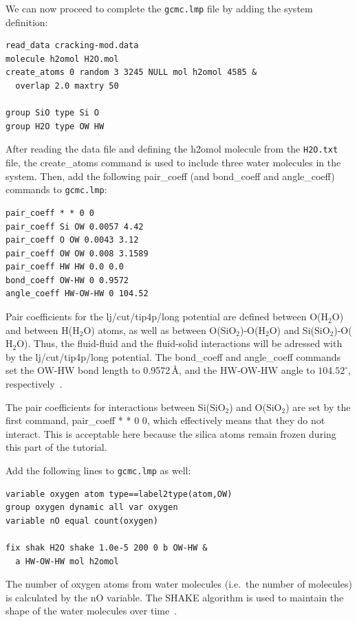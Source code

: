 \documentclass[9pt,tutorial]{livecoms}
\newcommand{\lmpcmd}[1]{\colorbox{listing}{\textcolor{command}{\small{#1}}}} %
\newcommand{\flecmd}[1]{\textcolor{command}{\texttt{#1}}} %
\begin{document}
We can now proceed to complete the \flecmd{gcmc.lmp} file by adding the system definition:
\begin{lstlisting}
read_data cracking-mod.data
molecule h2omol H2O.mol
create_atoms 0 random 3 3245 NULL mol h2omol 4585 &
  overlap 2.0 maxtry 50

group SiO type Si O
group H2O type OW HW
\end{lstlisting}
After reading the data file and defining the \lmpcmd{h2omol} molecule from the \flecmd{H2O.txt}
file, the \lmpcmd{create\_atoms} command is used to include three water molecules
in the system.  Then, add the following \lmpcmd{pair\_coeff} (and
\lmpcmd{bond\_coeff} and \lmpcmd{angle\_coeff}) commands
to \flecmd{gcmc.lmp}:
\begin{lstlisting}
pair_coeff * * 0 0
pair_coeff Si OW 0.0057 4.42
pair_coeff O OW 0.0043 3.12
pair_coeff OW OW 0.008 3.1589
pair_coeff HW HW 0.0 0.0
bond_coeff OW-HW 0 0.9572
angle_coeff HW-OW-HW 0 104.52
\end{lstlisting}
Pair coefficients for the \lmpcmd{lj/cut/tip4p/long}
potential are defined between O($\text{H}_2\text{O}$) and between H($\text{H}_2\text{O}$)
atoms, as well as between O($\text{SiO}_2$)-O($\text{H}_2\text{O}$) and
Si($\text{SiO}_2$)-O($\text{H}_2\text{O}$).  Thus, the fluid-fluid and the
fluid-solid interactions will be adressed with by the \lmpcmd{lj/cut/tip4p/long} potential.
The \lmpcmd{bond\_coeff} and \lmpcmd{angle\_coeff} commands set the \lmpcmd{OW-HW}
bond length to 0.9572\,\AA, and the \lmpcmd{HW-OW-HW}
angle to $104.52^\circ$, respectively~\cite{abascal2005general}.

\begin{note}
{\color{blue} The pair coefficients for interactions between Si($\text{SiO}_2$)
and O($\text{SiO}_2$) are set by the first command, \lmpcmd{pair\_coeff * * 0 0},
which effectively means that they do not interact. This is acceptable here because
the silica atoms remain frozen during this part of the tutorial.}
\end{note}

Add the following lines to \flecmd{gcmc.lmp} as well:
\begin{lstlisting}
variable oxygen atom type==label2type(atom,OW)
group oxygen dynamic all var oxygen
variable nO equal count(oxygen)

fix shak H2O shake 1.0e-5 200 0 b OW-HW &
  a HW-OW-HW mol h2omol
\end{lstlisting}
The number of oxygen atoms from water molecules (i.e.~the number of molecules)
is calculated by the \lmpcmd{nO} variable.  The SHAKE algorithm is used to
maintain the shape of the water molecules over time~\cite{ryckaert1977numerical, andersen1983rattle}.
\end{document}
